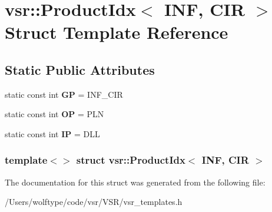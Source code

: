 \hypertarget{structvsr_1_1_product_idx_3_01_i_n_f_00_01_c_i_r_01_4}{\section{vsr\-:\-:Product\-Idx$<$ I\-N\-F, C\-I\-R $>$ Struct Template Reference}
\label{structvsr_1_1_product_idx_3_01_i_n_f_00_01_c_i_r_01_4}
}
\subsection*{Static Public Attributes}
\begin{DoxyCompactItemize}
\item 
\hypertarget{structvsr_1_1_product_idx_3_01_i_n_f_00_01_c_i_r_01_4_aa26c5a076679ad1b4baba36bc6274146}{static const int {\bfseries G\-P} = I\-N\-F\-\_\-\-C\-I\-R}\label{structvsr_1_1_product_idx_3_01_i_n_f_00_01_c_i_r_01_4_aa26c5a076679ad1b4baba36bc6274146}

\item 
\hypertarget{structvsr_1_1_product_idx_3_01_i_n_f_00_01_c_i_r_01_4_a66b4dbc21502d8a4f5385ba4ee10c841}{static const int {\bfseries O\-P} = P\-L\-N}\label{structvsr_1_1_product_idx_3_01_i_n_f_00_01_c_i_r_01_4_a66b4dbc21502d8a4f5385ba4ee10c841}

\item 
\hypertarget{structvsr_1_1_product_idx_3_01_i_n_f_00_01_c_i_r_01_4_a97dd35f20903b1f66109354ec4a77dc7}{static const int {\bfseries I\-P} = D\-L\-L}\label{structvsr_1_1_product_idx_3_01_i_n_f_00_01_c_i_r_01_4_a97dd35f20903b1f66109354ec4a77dc7}

\end{DoxyCompactItemize}
\subsubsection*{template$<$$>$ struct vsr\-::\-Product\-Idx$<$ I\-N\-F, C\-I\-R $>$}



The documentation for this struct was generated from the following file\-:\begin{DoxyCompactItemize}
\item 
/\-Users/wolftype/code/vsr/\-V\-S\-R/vsr\-\_\-templates.\-h\end{DoxyCompactItemize}
